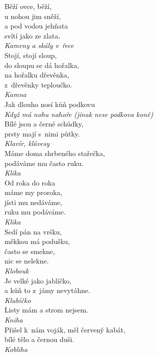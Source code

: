 \begin{multicols}{4}
\noindent
Běží ovce, běží,\\
u nohou jim sněží,\\
a pod vodou jehňata\\
svítí jako ze zlata.\\[1 mm]
{\sl Kameny a skály v~řece}\\

\noindent
Stojí, stojí sloup,\\
do sloupu se dá hořalka,\\
na hořalku dřevěnka,\\
z~dřevěnky teploučko.\\[1 mm]
{\sl Kamna}\\

\noindent
Jak dlouho nosí kůň podkovu\\[1 mm]
{\sl Když má nohu nahoře (jinak nese podkova koně)}\\

\noindent
Bílé jsou a černé schůdky,\\
prsty mají s~nimi půtky.\\[1 mm]
{\sl Klavír, klávesy}\\

\noindent
Máme doma shrbeného stařečka,\\
podáváme mu často ruku.\\[1 mm]
{\sl Klika}\\

\noindent
Od roka do roka\\
máme my proroka,\\
jísti mu nedáváme,\\
ruku mu podáváme.\\[1 mm]
{\sl Klika}\\

\noindent
Sedí pán na vršku,\\
měkkou má podušku,\\
často se smekne,\\
nic se nelekne.\\[1 mm]
{\sl Klobouk}\\

\noindent
Je velké jako jablíčko,\\
a kůň to z~jámy nevytáhne.\\[1 mm]
{\sl Klubíčko}\\

\noindent
Listy mám a strom nejsem.\\[1 mm]
{\sl Kniha}\\

\noindent
Přišel k~nám voják, měl červený kabát,\\
bílé tělo a černou duši.\\[1 mm]
{\sl Kobliha}\\


\end{multicols}
